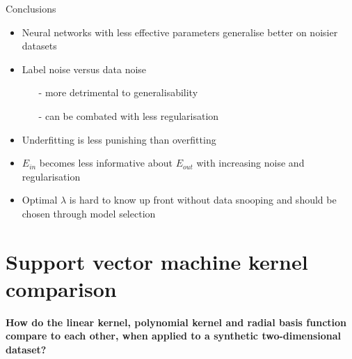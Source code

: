 \documentclass[9.5pt]{beamer}
\begin{document}
    \begin{frame}{Conclusions}
        \begin{itemize}
            \item Neural networks with less effective parameters generalise better on noisier datasets

            \item Label noise versus data noise
            \begin{itemize}
                \item[-] more detrimental to generalisability
                \item[-] can be combated with less regularisation
            \end{itemize}

            \item Underfitting is less punishing than overfitting

            \item $E_{in}$ becomes less informative about $E_{out}$ with increasing noise and regularisation

            \item Optimal $\lambda$ is hard to know up front without data snooping and should be chosen through model selection
        \end{itemize}
    \end{frame}


    \section{Support vector machine kernel comparison}

    \begin{frame}
        \textbf{How do the linear kernel, polynomial kernel and radial basis function compare to each other, when applied to a synthetic two-dimensional dataset?}
    \end{frame}
\end{document}
